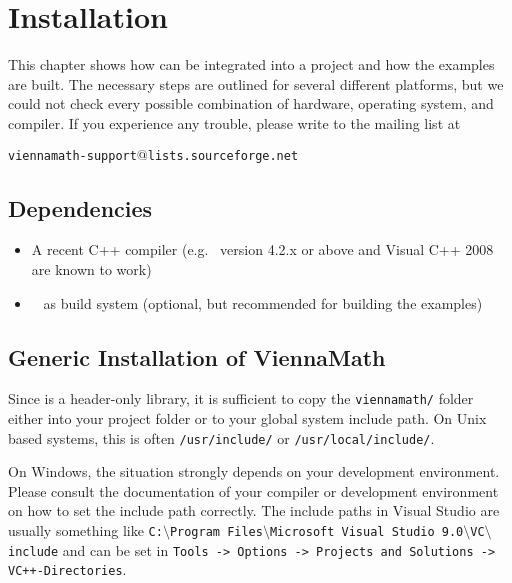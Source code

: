 \chapter{Installation}

This chapter shows how {\ViennaMath} can be integrated into a project and how
the examples are built. The necessary steps are outlined for several different
platforms, but we could not check every possible combination of hardware,
operating system, and compiler. If you experience any trouble, please write to
the mailing list at \\
\begin{center}
\texttt{viennamath-support$@$lists.sourceforge.net} 
\end{center}


\section{Dependencies}
\label{dependencies}

\begin{itemize}
 \item A recent C++ compiler (e.g.~{\GCC} version 4.2.x or above and Visual C++
2008 are known to work)
 \item {\CMake}~\cite{cmake} as build system (optional, but recommended
for building the examples)
\end{itemize}


\section{Generic Installation of ViennaMath} \label{sec:viennamath-installation}
Since {\ViennaMath} is a header-only library, it is sufficient to copy the 
\lstinline|viennamath/| folder either into your project folder or to your global system
include path. On Unix based systems, this is often \lstinline|/usr/include/| or
\lstinline|/usr/local/include/|.

On Windows, the situation strongly depends on your development environment.
Please consult the documentation of your compiler or development environment on how to set the include
path correctly. The include paths in Visual Studio are usually something like
\texttt{C:$\setminus$Program Files$\setminus$Microsoft Visual Studio
9.0$\setminus$VC$\setminus$include}
and can be set in \texttt{Tools -> Options -> Projects and Solutions ->
VC++-\-Directories}. 


